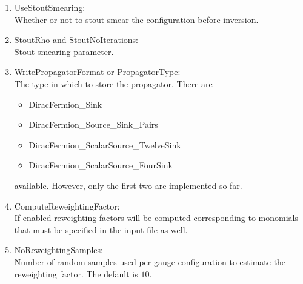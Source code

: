 \begin{enumerate}
\item {\ttfamily UseStoutSmearing}:\\
  Whether or not to stout smear the configuration before inversion.

\item {\ttfamily StoutRho} and {\ttfamily StoutNoIterations}:\\
  Stout smearing parameter.

\item {\ttfamily WritePropagatorFormat} or {\ttfamily PropagatorType}:\\
  The type in which to store the propagator. There are 
  \begin{itemize}
  \item {\ttfamily DiracFermion\_Sink}
  \item {\ttfamily DiracFermion\_Source\_Sink\_Pairs}
  \item {\ttfamily DiracFermion\_ScalarSource\_TwelveSink}
  \item {\ttfamily DiracFermion\_ScalarSource\_FourSink}
  \end{itemize}
  available. However, only the first two are implemented so far.

\item {\ttfamily ComputeReweightingFactor}:\\
  If enabled reweighting factors will be computed corresponding to
  monomials that must be specified in the input file as well.

\item {\ttfamily NoReweightingSamples}:\\
  Number of random samples used per gauge configuration to estimate
  the reweighting factor. The default is $10$.

\end{enumerate}


